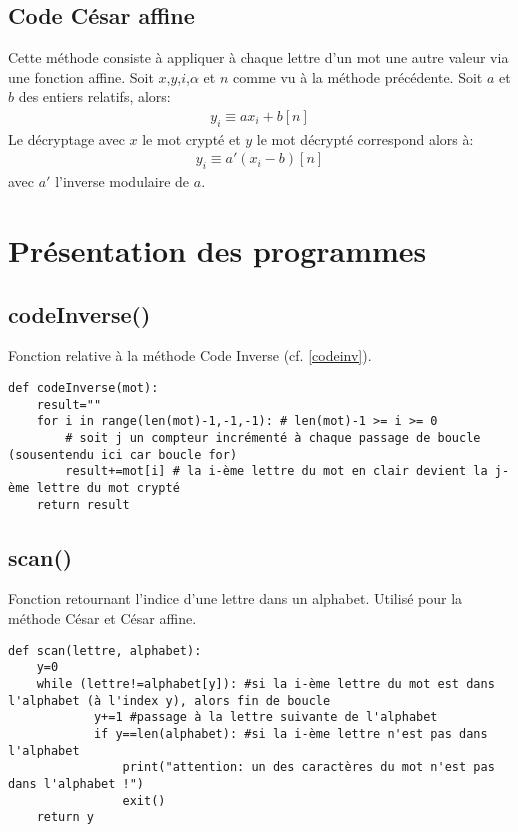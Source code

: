 \documentclass[10pt,a4paper,french]{article}
\begin{document}
\subsection{Code César affine}\label{cesaraff}
Cette méthode consiste à appliquer à chaque lettre d'un mot une autre valeur via une fonction affine. Soit $x$,$y$,$i$,$\alpha$ et $n$ comme vu à la méthode précédente. Soit $a$ et $b$ des entiers relatifs, alors:
\begin{align*}
y_i \equiv ax_i+b [n]
\end{align*}
Le décryptage avec $x$ le mot crypté et $y$ le mot décrypté correspond alors à:
\begin{align*}
y_i \equiv a'(x_i-b) [n]
\end{align*}
avec $a'$ l'inverse modulaire de $a$.

\section{Présentation des programmes}
\subsection{codeInverse()}
Fonction relative à la méthode Code Inverse (cf. \ref{codeinv}).
\begin{lstlisting}
def codeInverse(mot):
    result=""
    for i in range(len(mot)-1,-1,-1): # len(mot)-1 >= i >= 0
        # soit j un compteur incrémenté à chaque passage de boucle (sousentendu ici car boucle for)
        result+=mot[i] # la i-ème lettre du mot en clair devient la j-ème lettre du mot crypté
    return result
\end{lstlisting}
\subsection{scan()}
Fonction retournant l'indice d'une lettre dans un alphabet. Utilisé pour la méthode César et César affine.
\begin{lstlisting}
def scan(lettre, alphabet):
    y=0
    while (lettre!=alphabet[y]): #si la i-ème lettre du mot est dans l'alphabet (à l'index y), alors fin de boucle
            y+=1 #passage à la lettre suivante de l'alphabet
            if y==len(alphabet): #si la i-ème lettre n'est pas dans l'alphabet
                print("attention: un des caractères du mot n'est pas dans l'alphabet !")
                exit()
    return y
\end{lstlisting}
\end{document}
